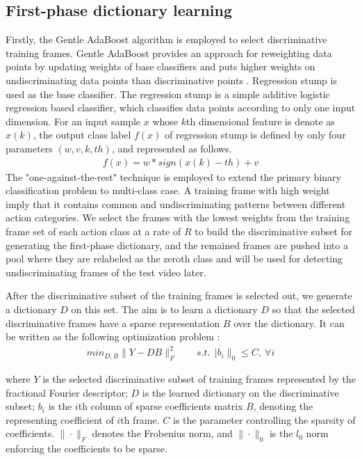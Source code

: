 \documentclass{article}
\begin{document}
\subsection{First-phase dictionary learning}
Firstly, the Gentle AdaBoost algorithm is  employed to select discriminative
training frames.
Gentle AdaBoost provides an  approach for reweighting data points by updating weights of base classifiers and  puts higher  weights on undiscriminating data points than  discriminative points \cite{Friedman98additivelogistic}.
Regression stump  is used as the base classifier. The regression stump is a simple additive logistic regression based classifier, which classifies data points according to only one input dimension. For an input sample $x$ whose $k$th dimensional feature is denote as $x(k)$, the output class label $f(x)$  of regression stump is defined by only four parameters $(w,v,k,th)$, and represented as follows.
\begin{equation} \label{eq5}
 \begin{aligned}
  f(x) = w*sign(x(k)-th)+v
 \end{aligned}
\end{equation}
The "one-against-the-rest" technique is employed to extend the primary binary
classification problem to multi-class case.
A training frame  with high weight imply that it contains common and undiscriminating patterns between different action categories.
We select the frames with the lowest weights from  the training frame set of each action class at a rate of $R$ to build the discriminative subset for generating the first-phase dictionary, and the remained frames are pushed into a pool where they are relabeled as the zeroth class and will be used for detecting
undiscriminating frames of the test video later.

After the discriminative subset of the training frames is selected out, we generate a dictionary $D$ on this set.
The aim is to learn a dictionary $D$ so that the selected discriminative frames  have a sparse representation $B$ over the dictionary.
It can be written as the following optimization problem  \cite{AharonKSVD}:
\begin{equation} \label{eq1}
 \begin{aligned}
min_{D,B}\|Y-DB\|_{F}^{2} \  \ \ \ \ \ \ \ \ s.t.\ \ |b_{i}\|_{0}\leq C ,\ \forall i
 \end{aligned}
\end{equation}

where $Y$ is the selected discriminative subset of training frames represented by the fractional Fourier descriptor;
$D$ is the learned dictionary on the discriminative subset; $b_{i}$ is the $i$th column of sparse coefficients matrix $B$, denoting the representing coefficient  of $i$th frame.
$C$ is the parameter controlling the sparsity of  coefficients.
$\|\cdot\|_{F}$ denotes the Frobenius norm, and $\|\cdot\|_{0}$  is the $l_{0}$ norm  enforcing the coefficients to be sparse.
\end{document}
